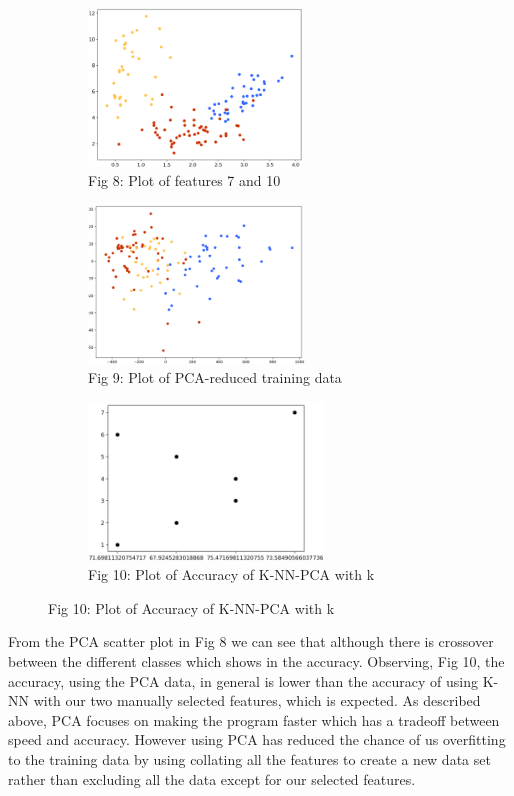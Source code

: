 \documentclass[11pt]{article}
\begin{document}
\begin{figure}[h!]
\captionsetup[subfigure]{labelformat=empty}
\begin{subfigure}{.33\textwidth}
\centering
\includegraphics[height=4.2cm]{7and10.png}
\caption{Fig 8: Plot of features 7 and 10}
\end{subfigure}%
\begin{subfigure}{.33\textwidth}
\centering
\includegraphics[height=4.2cm]{pca.png}
\caption{Fig 9: Plot of PCA-reduced training data}
\end{subfigure}%
\begin{subfigure}{.33\textwidth}
\centering
\includegraphics[height=4.2cm]{pcaaccuracy.png}
\caption{Fig 10: Plot of Accuracy of K-NN-PCA with k}
\end{subfigure}%
\end{figure}

\noindent
From the PCA scatter plot in Fig 8 we can see that although there is crossover between the different classes which shows in the accuracy. Observing, Fig 10, the accuracy, using the PCA data, in general is lower than the accuracy of using K-NN with our two manually selected features, which is expected. As described above, PCA focuses on making the program faster which has a tradeoff between speed and accuracy. However using PCA has reduced the chance of us overfitting to the training data by using collating all the features to create a new data set rather than excluding all the data except for our selected features.
\end{document}
